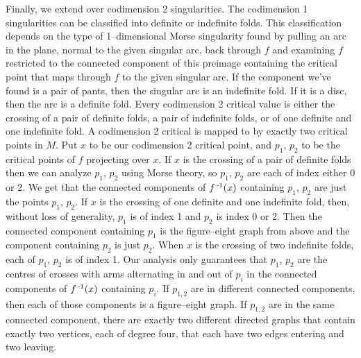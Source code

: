 Finally, we extend over codimension 2 singularities.
The codimension 1 singularities can be classified into definite or indefinite folds.
This classification depends on the type of 1--dimensional Morse singularity found by pulling an arc in the plane, normal to the given singular arc, back through $f$ and examining $f$ restricted to the connected component of this preimage containing the critical point that maps through $f$ to the given singular arc.
If the component we've found is a pair of pants, then the singular arc is an indefinite fold.
If it is a disc, then the arc is a definite fold.
Every codimension 2 critical value is either the crossing of a pair of definite folds, a pair of indefinite folds, or of one definite and one indefinite fold.
A codimension 2 critical is mapped to by exactly two critical points in $M$.
Put $x$ to be our codimension 2 critical point, and $p_1$, $p_2$ to be the critical points of $f$ projecting over $x$.
If $x$ is the crossing of a pair of definite folds then we can analyze $p_1$, $p_2$ using Morse theory, so $p_1$, $p_2$ are each of index either 0 or 2.
We get that the connected components of $f^{\,\text{-}1} (x)$ containing $p_1$, $p_2$ are just the points $p_1$, $p_2$.
If $x$ is the crossing of one definite and one indefinite fold, then, without loss of generality, $p_1$ is of index 1 and $p_2$ is index 0 or 2.
Then the connected component containing $p_1$ is the figure--eight graph from above and the component containing $p_2$ is just $p_2$.
When $x$ is the crossing of two indefinite folds, each of $p_1$, $p_2$ is of index 1.
Our analysis only guarantees that $p_1$, $p_2$ are the centres of crosses with arms alternating in and out of $p_i$ in the connected components of $f^{\,\text{-}1}(x)$ containing $p_i$.
If $p_{1,2}$ are in different connected components, then each of those components is a figure--eight graph.
If $p_{1,2}$ are in the same connected component, there are exactly two different directed graphs that contain exactly two vertices, each of degree four, that each have two edges entering and two leaving.

